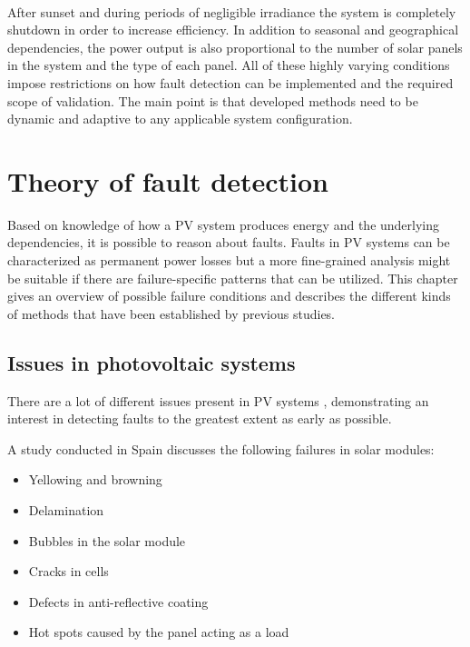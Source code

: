\begin{figure}[here]
\centering
{}
~
\end{figure}

After sunset and during periods of negligible irradiance the system is completely shutdown in order to increase efficiency.
In addition to seasonal and geographical dependencies, the power output is also proportional to the number of solar panels in the system and the type of each panel.
All of these highly varying conditions impose restrictions on how fault detection can be implemented and the required scope of validation.
The main point is that developed methods need to be dynamic and adaptive to any applicable system configuration.

\chapter{Theory of fault detection}
Based on knowledge of how a PV system produces energy and the underlying dependencies,
it is possible to reason about faults.
Faults in PV systems can be characterized as permanent power losses but a more fine-grained analysis might be suitable if there are failure-specific patterns that can be utilized.
This chapter gives an overview of possible failure conditions and describes the different kinds of methods that have been established by previous studies.

\section{Issues in photovoltaic systems}
There are a lot of different issues present in PV systems \cite{Baltus1997,King2002,Petrone2008}, demonstrating an interest in detecting faults to the greatest extent as early as possible.

A study conducted in Spain\cite{Munoz2011} discusses the following failures in solar modules:
\begin{itemize}
\item Yellowing and browning
\item Delamination
\item Bubbles in the solar module
\item Cracks in cells
\item Defects in anti-reflective coating
\item Hot spots caused by the panel acting as a load
\end{itemize}

